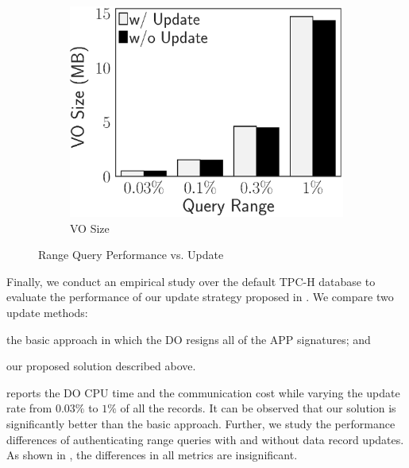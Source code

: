 \begin{figure}[t]
\begin{subfigure}{.33\linewidth}
        \includegraphics[height=\ht\figbox]{exp-figs/access-control/update_vo.eps}
        \caption{VO Size}
    \end{subfigure}
    \caption{Range Query Performance vs. Update}\label{exp-fig:access-control:update}
\end{figure}

Finally, we conduct an empirical study over the default TPC-H database to evaluate the performance of our update strategy proposed in . We compare two update methods:
\begin{inlineenum}
    \item the basic approach in which the DO resigns all of the APP signatures; and
    \item our proposed solution described above.
\end{inlineenum}
 reports the DO CPU time and the communication cost while varying the update rate from $0.03\%$ to $1\%$ of all the records. It can be observed that our solution is significantly better than the basic approach. Further, we study the performance differences of authenticating range queries with and without data record updates. As shown in , the differences in all metrics are insignificant.

